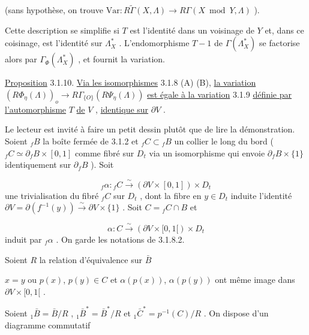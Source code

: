 
 (sans hypothèse, on trouve $\mathrm{Var} : R\widetilde{\Gamma} (X, \Lambda) \longrightarrow R\Gamma (X \bmod Y, \Lambda)$ ).

Cette description se simplifie si $T$ est l'identité dans un voisinage de $Y$ et, dans ce coisinage, est l'identité sur $\Lambda^*_X$ . L'endomorphisme $T-1$ de $\Gamma (\Lambda^*_X)$ se factorise alors par $\Gamma_\Phi(\Lambda^*_X)$ , et fournit la variation.

\underline{Proposition} 3.1.10. \underline{Via les isomorphismes} 3.1.8 (A) (B), \underline{la variation} $(R\Phi_\eta(\Lambda))_o \to R\Gamma_{\{O\}}(R\Psi_\eta(\Lambda))$ \underline{est égale à la variation} 3.1.9 \underline{définie par l'automorphisme} $T$ \underline{de} $V$ , \underline{identique sur} $\partial V$ .

Le lecteur est invité à faire un petit dessin plutôt que de lire la démonstration. Soient ${}_fB$ la boîte fermée de 3.1.2 et ${}_fC \subset {}_fB$ un collier le long du bord ( ${}_fC \simeq \partial_fB \times [0, 1]$ comme fibré sur $D_t$ via un isomorphisme qui envoie $\partial_fB \times \{1\}$ identiquement sur $\partial_fB$ ). Soit

\begin{equation*}
{}_f\alpha : {}_fC \overset{\sim}{\longrightarrow} (\partial V \times [0,1]) \times D_t
\end{equation*}
une trivialisation du fibré ${}_fC$ sur $D_t$ , dont la fibre en $y \in D_t$ induite l'identité $\partial V = \partial(f^{-1}(y)) \overset{\sim}{\longrightarrow} \partial V \times \{1\}$ . Soit $C = {}_fC \cap B$ et

\begin{equation*}
\alpha : C \overset{\sim}{\longrightarrow} (\partial V \times [0,1[) \times D_t
\end{equation*}
induit par ${}_f\alpha$ . On garde les notations de 3.1.8.2.

Soient $R$ la relation d'équivalence sur $\bar{B}$

$x = y$ ou $p(x)$, $p(y) \in C$ et $\alpha(p(x))$, $\alpha(p(y))$ ont même image dans $\partial V \times [0,1[$ .

Soient ${}_1\bar{B} = \bar{B}/R$ , ${}_1\bar{B}^* = \bar{B}^*/R$ et ${}_1\bar{C}^* = p^{-1}(C)/R$ . On dispose d'un diagramme commutatif 



